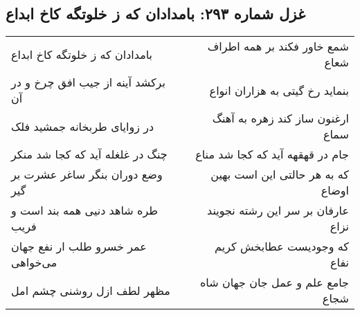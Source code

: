 \begin{center}
\section*{غزل شماره ۲۹۳: بامدادان که ز خلوتگه کاخ ابداع}
\label{sec:sh293}
\begin{longtable}{l p{0.5cm} r}
بامدادان که ز خلوتگه کاخ ابداع
&&
شمع خاور فکند بر همه اطراف شعاع
\\
برکشد آینه از جیب افق چرخ و در آن
&&
بنماید رخ گیتی به هزاران انواع
\\
در زوایای طربخانه جمشید فلک
&&
ارغنون ساز کند زهره به آهنگ سماع
\\
چنگ در غلغله آید که کجا شد منکر
&&
جام در قهقهه آید که کجا شد مناع
\\
وضع دوران بنگر ساغر عشرت بر گیر
&&
که به هر حالتی این است بهین اوضاع
\\
طره شاهد دنیی همه بند است و فریب
&&
عارفان بر سر این رشته نجویند نزاع
\\
عمر خسرو طلب ار نفع جهان می‌خواهی
&&
که وجودیست عطابخش کریم نفاع
\\
مظهر لطف ازل روشنی چشم امل
&&
جامع علم و عمل جان جهان شاه شجاع
\\
\end{longtable}
\end{center}
